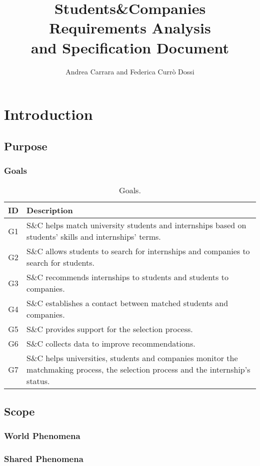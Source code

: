 \documentclass[a4paper, oneside]{book}
\title{
    Students\&Companies \\
    \Huge Requirements Analysis \\
    and Specification Document
}
\author{Andrea Carrara and Federica Currò Dossi}
\begin{document}
\maketitle

\tableofcontents

\chapter{Introduction}
\section{Purpose}
\subsection{Goals}
\begin{table}[h]
\renewcommand{\arraystretch}{1.5}
\begin{tabular}{|c|p{10.5 cm}|}
    \hline
    \textbf{ID} & \textbf{ Description} \\ \hline \hline
    G1 & S\&C helps match university students and internships based on students' skills and internships' terms. \\ \hline
    G2 & S\&C allows students to search for internships and companies to search for students. \\ \hline
    G3 & S\&C recommends internships to students and students to companies. \\ \hline
    G4 & S\&C establishes a contact between matched students and companies. \\ \hline
    G5 & S\&C provides support for the selection process. \\ \hline
    G6 & S\&C collects data to improve recommendations. \\ \hline
    G7 & S\&C helps universities, students and companies monitor the matchmaking process, the selection process and the internship's status. \\ \hline
\end{tabular}
\caption{Goals.}
\end{table}

\section{Scope}
\subsection{World Phenomena}
\subsection{Shared Phenomena}
\end{document}
